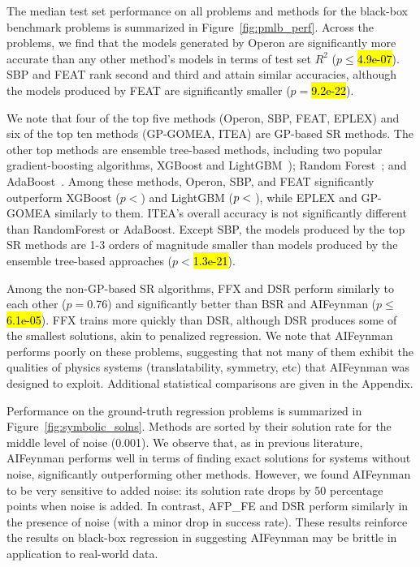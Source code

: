 The median test set performance on all problems and methods for the black-box benchmark problems is summarized in Figure~\ref{fig:pmlb_perf}.  
Across the problems, we find that the models generated by Operon are significantly more accurate than any other method's models in terms of test set $R^2$ ($p\leq$\hl{4.9e-07}). 
SBP and FEAT rank second and third and attain similar accuracies, although the models produced by FEAT are significantly smaller ($p=$\hl{9.2e-22}).

We note that four of the top five methods (Operon, SBP, FEAT, EPLEX) and six of the top ten methods (GP-GOMEA, ITEA) are GP-based SR methods. 
The other top methods are ensemble tree-based methods, including two popular gradient-boosting algorithms, XGBoost and LightGBM~\cite{chenXgboostScalableTree2016,keLightgbmHighlyEfficient2017}); Random Forest~\cite{breimanRandomForests2001b}; and AdaBoost~\cite{}.
Among these methods, Operon, SBP, and FEAT significantly outperform XGBoost ($p<$\hl{}) and LightGBM ($p<\hl{}$), while EPLEX and GP-GOMEA similarly to them.  
ITEA's overall accuracy is not significantly different than RandomForest or AdaBoost. 
Except SBP, the models produced by the top SR methods are 1-3 orders of magnitude smaller than models produced by the ensemble tree-based approaches ($p<$\hl{1.3e-21}).

Among the non-GP-based SR algorithms, FFX and DSR perform similarly to each other ($p=$0.76) and significantly better than BSR and AIFeynman ($p\leq$\hl{6.1e-05}).
FFX trains more quickly than DSR, although DSR produces some of the smallest solutions, akin to penalized regression.
We note that AIFeynman performs poorly on these problems, suggesting that not many of them exhibit the qualities of physics systems (translatability, symmetry, etc) that AIFeynman was designed to exploit. 
Additional statistical comparisons are given in the Appendix.

Performance on the ground-truth regression problems is summarized in Figure~\ref{fig:symbolic_solns}. 
Methods are sorted by their solution rate for the middle level of noise (0.001). 
We observe that, as in previous literature, AIFeynman performs well in terms of finding exact solutions for systems without noise, significantly outperforming other methods. 
However, we found AIFeynman to be very sensitive to added noise: its solution rate drops by 50 percentage points when noise is added. 
In contrast, AFP\_FE and DSR perform similarly in the presence of noise (with a minor drop in success rate).
These results reinforce the results on black-box regression in suggesting AIFeynman may be brittle in application to real-world data. 

